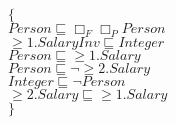 \documentclass[a4paper,10pt]{article}
\begin{document}
 \newcommand{\nxt}{{\ensuremath\raisebox{0.25ex}{\text{\scriptsize$\bigcirc$}}}}
\newcommand{\Rdiamond}{\Diamond_{\!F}}
\newcommand{\Rbox}{\Box_{\!F}}
\newcommand{\Rnext}{\nxt_{\!F}}
\newcommand{\Ldiamond}{\Diamond_{\!P}}
\newcommand{\Lbox}{\Box_{\!P}}
\newcommand{\Lnext}{\nxt_{\!P}}
\newcommand{\SVdiamond}{\mathop{\ooalign{$\Diamond$ \cr \kern0.5ex
    \raisebox{0.35ex}{\scalebox{0.7}{$*$}}} \kern-0.9ex}}
\newcommand{\SVbox}{\mathop{\ooalign{$\Box$ \cr \kern0.42ex
    \raisebox{0.3ex}{\scalebox{0.7}{$*$}}} \kern-0.9ex}}


 $\{$\\ 
$Person \sqsubseteq  \Rbox  \Lbox Person$\\ 
 $ \ge 1.SalaryInv \sqsubseteq Integer$\\ 
 $Person \sqsubseteq  \ge 1.Salary$\\ 
 $Person \sqsubseteq  \lnot  \ge 2.Salary$\\ 
 $Integer \sqsubseteq  \lnot Person$\\ 
 $ \ge 2.Salary \sqsubseteq  \ge 1.Salary$\\ 
 $\}$ 
\end{document}
